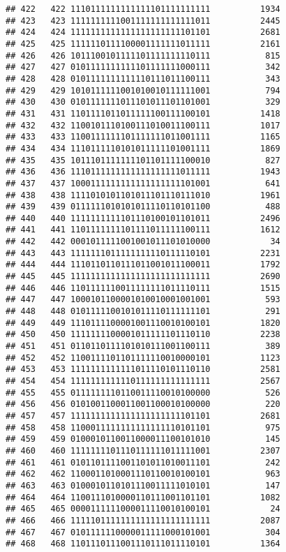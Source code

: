 \documentclass[]{article}
\begin{document}
\begin{verbatim}
## 422   422 1110111111111111101111111111          1934
## 423   423 1111111111001111111111111011          2445
## 424   424 1111111111111111111111101101          2681
## 425   425 1111110111100001111111011111          2161
## 426   426 1011100101111101111111110111           815
## 427   427 0101111111111101111111000111           342
## 428   428 0101111111111110111011100111           343
## 429   429 1010111111001010010111111001           794
## 430   430 0101111111011101011101101001           329
## 431   431 1101111011011111100111100101          1418
## 432   432 1100101110100111010011100111          1017
## 433   433 1100111111101111111011001111          1165
## 434   434 1110111110101011111101001111          1869
## 435   435 1011101111111101101111100010           827
## 436   436 1110111111111111111111011111          1943
## 437   437 1000111111111111111111101001           641
## 438   438 1111010101101011101110111010          1961
## 439   439 0111111010101011110110101100           488
## 440   440 1111111111101110100101101011          2496
## 441   441 1101111111101111011111100111          1612
## 442   442 0001011111001001011101010000            34
## 443   443 1111111011111111110111110101          2231
## 444   444 1110110110111011001011100011          1792
## 445   445 1111111111111111111111111111          2690
## 446   446 1101111110011111111011110111          1515
## 447   447 1000101100001010010001001001           593
## 448   448 0101111100101011110111111101           291
## 449   449 1110111100001001110010100101          1820
## 450   450 1111111100001011111101110110          2238
## 451   451 0110110111101010111001100111           389
## 452   452 1100111101101111110010000101          1123
## 453   453 1111111111111011110101110110          2581
## 454   454 1111111111110111111111111111          2567
## 455   455 0111111110110011110010100000           526
## 456   456 0101001100011001100010100000           220
## 457   457 1111111111111111111111101101          2681
## 458   458 1100011111111111111110101101           975
## 459   459 0100010110011000011100101010           145
## 460   460 1111111101110111111011111001          2307
## 461   461 0101101111001101011010011101           242
## 462   462 1100011010001110110010100101           963
## 463   463 0100010110101110011111010101           147
## 464   464 1100111010000110111001101101          1082
## 465   465 0000111111000011110010100101            24
## 466   466 1111101111111111111111111111          2087
## 467   467 0101111110000011111000101001           304
## 468   468 1101110111001110111011110101          1364

\end{verbatim}
\end{document}
